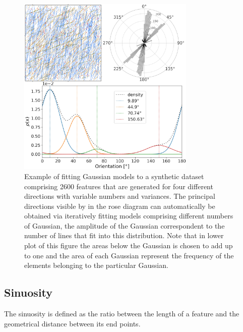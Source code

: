 \documentclass[a4paper,fleqn]{cas-sc}
\begin{document}
\begin{figure}[h]
\centering
	\includegraphics[width=8.5cm]{fig04.jpg}
	\caption{Example of fitting Gaussian models to a synthetic dataset comprising 2600 features that are generated for four different directions with variable numbers and variances. The principal directions visible by in the rose diagram can automatically be obtained via iteratively fitting models comprising different numbers of Gaussian, the amplitude of the Gaussian correspondent to the number of lines that fit into this distribution. Note that in lower plot of this figure the areas below the Gaussian is chosen to add up to one and the area of each Gaussian represent the frequency of the elements belonging to the particular Gaussian.}
\label{fig04}
\end{figure}

\subsection{Sinuosity}
The sinuosity is defined as the ratio between the length of a feature and the geometrical distance between its end points. 
\end{document}
